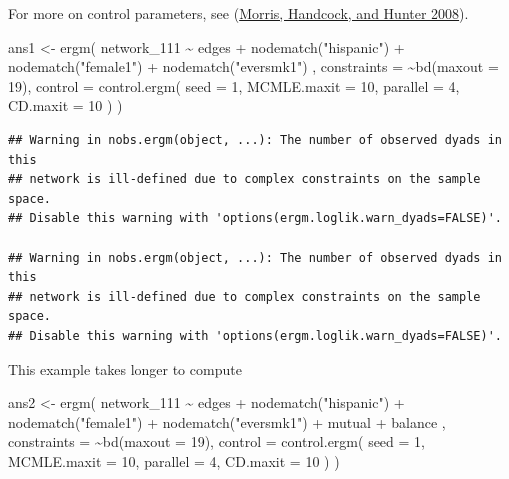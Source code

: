 \documentclass[
]{book}
\newenvironment{Shaded}{\begin{snugshade}}{\end{snugshade}}
\newcommand{\AttributeTok}[1]{\textcolor[rgb]{0.77,0.63,0.00}{#1}}
\newcommand{\DecValTok}[1]{\textcolor[rgb]{0.00,0.00,0.81}{#1}}
\newcommand{\FunctionTok}[1]{\textcolor[rgb]{0.00,0.00,0.00}{#1}}
\newcommand{\NormalTok}[1]{#1}
\newcommand{\OtherTok}[1]{\textcolor[rgb]{0.56,0.35,0.01}{#1}}
\newcommand{\SpecialCharTok}[1]{\textcolor[rgb]{0.00,0.00,0.00}{#1}}
\newcommand{\StringTok}[1]{\textcolor[rgb]{0.31,0.60,0.02}{#1}}
\begin{document}
For more on control parameters, see (\protect\hyperlink{ref-Morris2008}{Morris, Handcock, and Hunter 2008}).

\begin{Shaded}
\begin{Highlighting}[]
\NormalTok{ans1 }\OtherTok{\textless{}{-}} \FunctionTok{ergm}\NormalTok{(}
\NormalTok{  network\_111 }\SpecialCharTok{\textasciitilde{}}
\NormalTok{    edges }\SpecialCharTok{+}
    \FunctionTok{nodematch}\NormalTok{(}\StringTok{"hispanic"}\NormalTok{) }\SpecialCharTok{+}
    \FunctionTok{nodematch}\NormalTok{(}\StringTok{"female1"}\NormalTok{) }\SpecialCharTok{+}
    \FunctionTok{nodematch}\NormalTok{(}\StringTok{"eversmk1"}\NormalTok{)}
\NormalTok{    ,}
  \AttributeTok{constraints =} \SpecialCharTok{\textasciitilde{}}\FunctionTok{bd}\NormalTok{(}\AttributeTok{maxout =} \DecValTok{19}\NormalTok{),}
  \AttributeTok{control =} \FunctionTok{control.ergm}\NormalTok{(}
    \AttributeTok{seed        =} \DecValTok{1}\NormalTok{,}
    \AttributeTok{MCMLE.maxit =} \DecValTok{10}\NormalTok{,}
    \AttributeTok{parallel    =} \DecValTok{4}\NormalTok{,}
    \AttributeTok{CD.maxit    =} \DecValTok{10}
\NormalTok{    )}
\NormalTok{  )}
\end{Highlighting}
\end{Shaded}

\begin{verbatim}
## Warning in nobs.ergm(object, ...): The number of observed dyads in this
## network is ill-defined due to complex constraints on the sample space.
## Disable this warning with 'options(ergm.loglik.warn_dyads=FALSE)'.

## Warning in nobs.ergm(object, ...): The number of observed dyads in this
## network is ill-defined due to complex constraints on the sample space.
## Disable this warning with 'options(ergm.loglik.warn_dyads=FALSE)'.
\end{verbatim}

This example takes longer to compute

\begin{Shaded}
\begin{Highlighting}[]
\NormalTok{ans2 }\OtherTok{\textless{}{-}} \FunctionTok{ergm}\NormalTok{(}
\NormalTok{  network\_111 }\SpecialCharTok{\textasciitilde{}}
\NormalTok{    edges }\SpecialCharTok{+}
    \FunctionTok{nodematch}\NormalTok{(}\StringTok{"hispanic"}\NormalTok{) }\SpecialCharTok{+}
    \FunctionTok{nodematch}\NormalTok{(}\StringTok{"female1"}\NormalTok{) }\SpecialCharTok{+}
    \FunctionTok{nodematch}\NormalTok{(}\StringTok{"eversmk1"}\NormalTok{) }\SpecialCharTok{+} 
\NormalTok{    mutual }\SpecialCharTok{+}
\NormalTok{    balance}
\NormalTok{    ,}
  \AttributeTok{constraints =} \SpecialCharTok{\textasciitilde{}}\FunctionTok{bd}\NormalTok{(}\AttributeTok{maxout =} \DecValTok{19}\NormalTok{),}
  \AttributeTok{control =} \FunctionTok{control.ergm}\NormalTok{(}
    \AttributeTok{seed        =} \DecValTok{1}\NormalTok{,}
    \AttributeTok{MCMLE.maxit =} \DecValTok{10}\NormalTok{,}
    \AttributeTok{parallel    =} \DecValTok{4}\NormalTok{,}
    \AttributeTok{CD.maxit    =} \DecValTok{10}
\NormalTok{    )}
\NormalTok{  )}
\end{Highlighting}
\end{Shaded}
\end{document}
